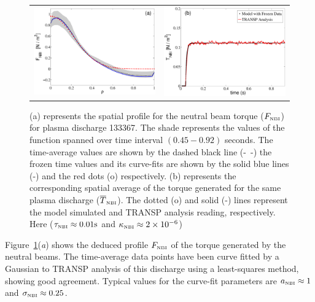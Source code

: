 \documentclass[12pt]{iopart}
\begin{document}
\begin{figure}
\begin{tabular}{cc}
\includegraphics[width=0.5\linewidth]{imene_figs/Goum7}& %
\includegraphics[width=0.5\linewidth]{imene_figs/Goum8}%
\end{tabular}
\caption{(a) represents the spatial profile for the neutral beam torque ($F_\textrm{\tiny{NBI}} $) for plasma discharge 133367.  The shade represents the values of the function spanned over time interval $(0.45-0.92)$ seconds.  The time-average values are shown by the dashed black line (-~-) the frozen time values and its curve-fits are shown by the solid blue lines (-) and the red dots (o) respectively. (b) represents the corresponding spatial average of the torque generated for the same plasma discharge ($ \overline{T}_\textrm{\tiny{NBI}}$). The dotted (o) and  solid (-) lines represent the model simulated and TRANSP analysis reading, respectively.  Here ($\tau_\textrm{\tiny{NBI}} \approx 0.01 \textrm{s}$ and $\kappa_\textrm{\tiny{NBI}} \approx 2\times10^{-6} $)}
\label{fig:Fnbi}
\end{figure}
Figure~{\ref{fig:Fnbi}}(\emph{a}) shows the deduced profile $F_\textrm{\tiny{NBI}}$ of the torque generated by the neutral beams. The time-average data points have been curve fitted by a Gaussian to TRANSP analysis of this discharge using a least-squares method, showing good agreement.  Typical values for the curve-fit parameters are $a_\textrm{\tiny{NBI}} \approx 1$ and $\sigma_\textrm{\tiny{NBI}} \approx 0.25$.
\end{document}
